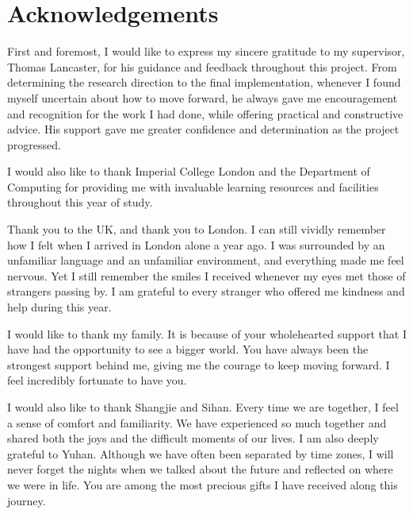 \documentclass[12pt,oneside]{report}
\begin{document}
\chapter*{Acknowledgements}

First and foremost, I would like to express my sincere gratitude to my supervisor, Thomas Lancaster, for his guidance and feedback throughout this project. From determining the research direction to the final implementation, whenever I found myself uncertain about how to move forward, he always gave me encouragement and recognition for the work I had done, while offering practical and constructive advice. His support gave me greater confidence and determination as the project progressed.

\vspace{1em}

I would also like to thank Imperial College London and the Department of Computing for providing me with invaluable learning resources and facilities throughout this year of study.

\vspace{1em}

Thank you to the UK, and thank you to London. I can still vividly remember how I felt when I arrived in London alone a year ago. I was surrounded by an unfamiliar language and an unfamiliar environment, and everything made me feel nervous. Yet I still remember the smiles I received whenever my eyes met those of strangers passing by. I am grateful to every stranger who offered me kindness and help during this year.

\vspace{1em}

I would like to thank my family. It is because of your wholehearted support that I have had the opportunity to see a bigger world. You have always been the strongest support behind me, giving me the courage to keep moving forward. I feel incredibly fortunate to have you.

\vspace{1em}

I would also like to thank Shangjie and Sihan. Every time we are together, I feel a sense of comfort and familiarity. We have experienced so much together and shared both the joys and the difficult moments of our lives. I am also deeply grateful to Yuhan. Although we have often been separated by time zones, I will never forget the nights when we talked about the future and reflected on where we were in life. You are among the most precious gifts I have received along this journey.
\end{document}
